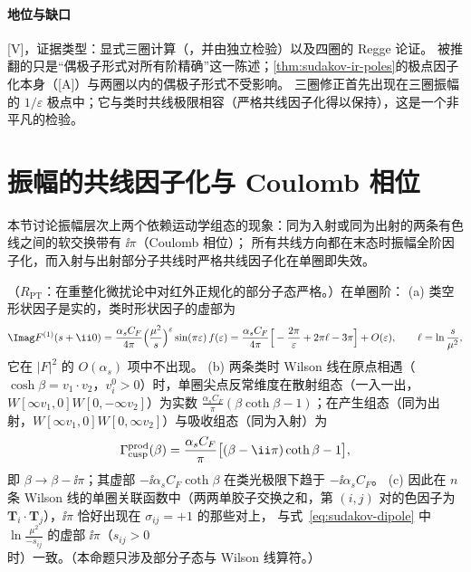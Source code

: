 \paragraph{地位与缺口}[V]，证据类型：显式三圈计算（\cite{Almelid:2015jia}，并由\cite{Henn:2016jdu}独立检验）以及四圈的 Regge 论证\cite{Caron-Huot:2013fea}。
被推翻的只是“偶极子形式对所有阶精确”这一陈述；\cref{thm:sudakov-ir-poles}的极点因子化本身（[A]）与两圈以内的偶极子形式不受影响。
三圈修正首先出现在三圈振幅的 $1/\varepsilon$ 极点中；它与类时共线极限相容（严格共线因子化得以保持），这是一个非平凡的检验。
\section{振幅的共线因子化与 Coulomb 相位}\label{sec:sudakov-collinear}

本节讨论振幅层次上两个依赖运动学组态的现象：同为入射或同为出射的两条有色线之间的软交换带有 $\ii\pi$（Coulomb 相位）；
所有共线方向都在末态时振幅全阶因子化，而入射与出射部分子共线时严格共线因子化在单圈即失效。

\begin{proposition}\label{prop:sudakov-coulomb}
（$R_{\mathrm{PT}}$：在重整化微扰论中对红外正规化的部分子态严格。）在单圈阶：
(a) 类空形状因子是实的，类时形状因子的虚部为
\begin{equation}\label{eq:sudakov-coulomb-ff}
\Imag F^{(1)}(s+\ii0)=\frac{\alpha_sC_F}{4\pi}\Big(\frac{\mu^2}{s}\Big)^{\varepsilon}\sin(\pi\varepsilon)\,f(\varepsilon)
=\frac{\alpha_sC_F}{4\pi}\Big[-\frac{2\pi}{\varepsilon}+2\pi\ell-3\pi\Big]+O(\varepsilon),\qquad \ell=\ln\frac{s}{\mu^2},
\end{equation}
它在 $|F|^2$ 的 $O(\alpha_s)$ 项中不出现。
(b) 两条类时 Wilson 线在原点相遇（$\cosh\beta=v_1\cdot v_2$，$v_i^0>0$）时，单圈尖点反常维度在散射组态（一入一出，$W[\infty v_1,0]W[0,-\infty v_2]$）为实数
$\frac{\alpha_sC_F}\pi(\beta\coth\beta-1)$；在产生组态（同为出射，$W[\infty v_1,0]W[0,\infty v_2]$）与吸收组态（同为入射）为
\begin{equation}\label{eq:sudakov-coulomb-cusp}
\Gamma_{\rm cusp}^{\rm prod}(\beta)=\frac{\alpha_sC_F}{\pi}\big[(\beta-\ii\pi)\coth\beta-1\big],
\end{equation}
即 $\beta\to\beta-\ii\pi$；其虚部 $-\ii\alpha_sC_F\coth\beta$ 在类光极限下趋于 $-\ii\alpha_sC_F$。
(c) 因此在 $n$ 条 Wilson 线的单圈关联函数中（两两单胶子交换之和，第 $(i,j)$ 对的色因子为 $\mathbf T_i\cdot\mathbf T_j$），$\ii\pi$ 恰好出现在 $\sigma_{ij}=+1$ 的那些对上，
与式~\eqref{eq:sudakov-dipole} 中 $\ln\frac{\mu^2}{-s_{ij}}$ 的虚部 $\ii\pi$（$s_{ij}>0$ 时）一致。（本命题只涉及部分子态与 Wilson 线算符。）
\end{proposition}

